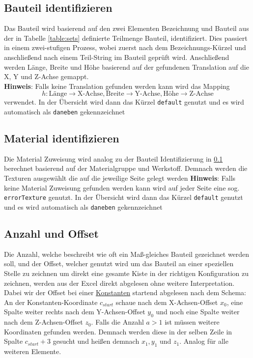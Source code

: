 \documentclass{book}
\newcommand{\hinweis}[1]{\newline \textbf{Hinweis}: #1 \newline}
\begin{document}
			\subsection{Bauteil identifizieren}\label{bauteil ident}
				Das Bauteil wird basierend auf den zwei Elementen Bezeichnung und Bauteil aus der in Tabelle \ref{table:sets} definierte Teilmenge Bauteil, identifiziert. Dies passiert in einem zwei-stufigen Prozess, wobei zuerst nach dem Bezeichnungs-Kürzel und anschließend nach einem Teil-String im Bauteil geprüft wird. Anschließend werden Länge, Breite und Höhe basierend auf der gefundenen Translation auf die X, Y und Z-Achse gemappt. \\
				\hinweis{Falls keine Translation gefunden werden kann wird das Mapping $$h: \text{Länge}\rightarrow\text{X-Achse},\text{Breite}\rightarrow\text{Y-Achse},\text{Höhe}\rightarrow\text{Z-Achse} $$ verwendet. In der Übersicht wird dann das Kürzel \texttt{default} genutzt und es wird automatisch als \texttt{daneben} gekennzeichnet}
			\subsection{Material identifizieren}
				Die Material Zuweisung wird analog zu der Bauteil Identifizierung in \ref{bauteil ident} berechnet basierend auf der Materialgruppe und Werkstoff. Demnach werden die Texturen ausgewählt die auf die jeweilige Seite gelegt werden
				\hinweis{Falls keine Material Zuweisung gefunden werden kann wird auf jeder Seite eine sog. \texttt{errorTexture} genutzt. In der Übersicht wird dann das Kürzel \texttt{default} genutzt und es wird automatisch als \texttt{daneben} gekennzeichnet}
			\subsection{Anzahl und Offset}
				Die Anzahl, welche beschreibt wie oft ein Maß-gleiches Bauteil gezeichnet werden soll, und der Offset, welcher genutzt wird um das Bauteil an einer speziellen Stelle zu zeichnen um direkt eine gesamte Kiste in der richtigen Konfiguration zu zeichnen, werden aus der Excel direkt abgelesen ohne weitere Interpretation. Dabei wir der Offset bei einer \hyperref[excel konstanten]{Konstanten} startend abgelesen nach dem Schema:
				An der Konstanten-Koordinate $c_{start}$ schaue nach dem X-Achsen-Offset $x_0$, eine Spalte weiter rechts nach dem Y-Achsen-Offset $y_0$ und noch eine Spalte weiter nach dem Z-Achsen-Offset $z_0$. Falls die Anzahl $a > 1$ ist müssen weitere Koordinaten gefunden werden. Demnach werden diese in der selben Zeile in Spalte $c_{start}+3$ gesucht und heißen demnach $x_1, y_1$ und $z_1$. Analog für alle weiteren Elemente. 
				
\end{document}
